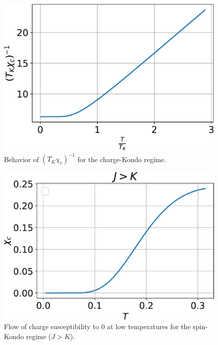 \documentclass[twoside,11pt]{report}
\numberwithin{equation}{section}
\begin{document}
\begin{figure}[htpb]
	\centering
	\includegraphics[height=0.27\textheight]{../figures/one_over_chi_c_new.pdf}
	\caption{Behavior of \(\left(T_K \chi_c\right)^{-1}\) for the charge-Kondo regime.}
	\label{one_over_chic}
\end{figure}
\begin{figure}[htpb]
	\centering
	\includegraphics[width=0.4\textheight]{../figures/chi_c_zero_new.pdf}
	\caption{Flow of charge susceptibility to 0 at low temperatures for the spin-Kondo regime (\(J>K\)).}
	\label{chi_c_zero}
\end{figure}
\end{document}

